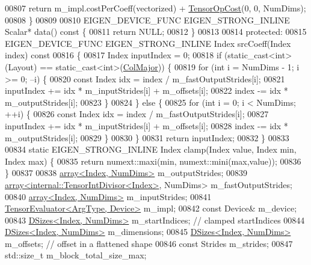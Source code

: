 \begin{DoxyCode}
00807     \textcolor{keywordflow}{return} m\_impl.costPerCoeff(vectorized) + \hyperlink{class_eigen_1_1_tensor_op_cost}{TensorOpCost}(0, 0, NumDims);
00808   \}
00809 
00810   EIGEN\_DEVICE\_FUNC EIGEN\_STRONG\_INLINE Scalar* data()\textcolor{keyword}{ const }\{
00811     \textcolor{keywordflow}{return} NULL;
00812   \}
00813 
00814  \textcolor{keyword}{protected}:
00815   EIGEN\_DEVICE\_FUNC EIGEN\_STRONG\_INLINE Index srcCoeff(Index index)\textcolor{keyword}{ const}
00816 \textcolor{keyword}{  }\{
00817     Index inputIndex = 0;
00818     \textcolor{keywordflow}{if} (static\_cast<int>(Layout) == static\_cast<int>(\hyperlink{group__enums_ggaacded1a18ae58b0f554751f6cdf9eb13a0cbd4bdd0abcfc0224c5fcb5e4f6669a}{ColMajor})) \{
00819       \textcolor{keywordflow}{for} (\textcolor{keywordtype}{int} i = NumDims - 1; i >= 0; --i) \{
00820         \textcolor{keyword}{const} Index idx = index / m\_fastOutputStrides[i];
00821         inputIndex += idx * m\_inputStrides[i] + m\_offsets[i];
00822         index -= idx * m\_outputStrides[i];
00823       \}
00824     \} \textcolor{keywordflow}{else} \{
00825       \textcolor{keywordflow}{for} (\textcolor{keywordtype}{int} i = 0; i < NumDims; ++i) \{
00826         \textcolor{keyword}{const} Index idx = index / m\_fastOutputStrides[i];
00827         inputIndex += idx * m\_inputStrides[i] + m\_offsets[i];
00828         index -= idx * m\_outputStrides[i];
00829       \}
00830     \}
00831     \textcolor{keywordflow}{return} inputIndex;
00832   \}
00833 
00834   \textcolor{keyword}{static} EIGEN\_STRONG\_INLINE Index clamp(Index value, Index min, Index max) \{
00835     \textcolor{keywordflow}{return} numext::maxi(min, numext::mini(max,value));
00836   \}
00837 
00838   \hyperlink{class_eigen_1_1array}{array<Index, NumDims>} m\_outputStrides;
00839   \hyperlink{class_eigen_1_1array}{array<internal::TensorIntDivisor<Index>}, NumDims> 
      m\_fastOutputStrides;
00840   \hyperlink{class_eigen_1_1array}{array<Index, NumDims>} m\_inputStrides;
00841   \hyperlink{struct_eigen_1_1_tensor_evaluator}{TensorEvaluator<ArgType, Device>} m\_impl;
00842   \textcolor{keyword}{const} Device& m\_device;
00843   \hyperlink{struct_eigen_1_1_d_sizes}{DSizes<Index, NumDims>} m\_startIndices; \textcolor{comment}{// clamped startIndices}
00844   \hyperlink{struct_eigen_1_1_d_sizes}{DSizes<Index, NumDims>} m\_dimensions;
00845   \hyperlink{struct_eigen_1_1_d_sizes}{DSizes<Index, NumDims>} m\_offsets; \textcolor{comment}{// offset in a flattened shape}
00846   \textcolor{keyword}{const} Strides m\_strides;
00847   std::size\_t m\_block\_total\_size\_max;

\end{DoxyCode}
